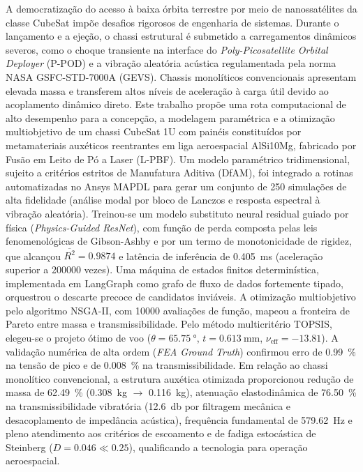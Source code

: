 
\begin{center}
\ABNTEXchapterfont\bfseries\Large\imprimirtitulo
\end{center}

\begin{resumo}
A democratização do acesso à baixa órbita terrestre por meio de nanossatélites da classe CubeSat impõe desafios rigorosos de engenharia de sistemas. Durante o lançamento e a ejeção, o chassi estrutural é submetido a carregamentos dinâmicos severos, como o choque transiente na interface do \textit{Poly-Picosatellite Orbital Deployer} (P-POD) e a vibração aleatória acústica regulamentada pela norma NASA GSFC-STD-7000A (GEVS). Chassis monolíticos convencionais apresentam elevada massa e transferem altos níveis de aceleração à carga útil devido ao acoplamento dinâmico direto. Este trabalho propõe uma rota computacional de alto desempenho para a concepção, a modelagem paramétrica e a otimização multiobjetivo de um chassi CubeSat 1U com painéis constituídos por metamateriais auxéticos reentrantes em liga aeroespacial AlSi10Mg, fabricado por Fusão em Leito de Pó a Laser (L-PBF). Um modelo paramétrico tridimensional, sujeito a critérios estritos de Manufatura Aditiva (DfAM), foi integrado a rotinas automatizadas no Ansys MAPDL para gerar um conjunto de 250 simulações de alta fidelidade (análise modal por bloco de Lanczos e resposta espectral à vibração aleatória). Treinou-se um modelo substituto neural residual guiado por física (\textit{Physics-Guided ResNet}), com função de perda composta pelas leis fenomenológicas de Gibson-Ashby e por um termo de monotonicidade de rigidez, que alcançou $\overline{R^2} = \num{0.9874}$ e latência de inferência de \SI{0.405}{\milli\second} (aceleração superior a \num{200000} vezes). Uma máquina de estados finitos determinística, implementada em LangGraph como grafo de fluxo de dados fortemente tipado, orquestrou o descarte precoce de candidatos inviáveis. A otimização multiobjetivo pelo algoritmo NSGA-II, com \num{10000} avaliações de função, mapeou a fronteira de Pareto entre massa e transmissibilidade. Pelo método multicritério TOPSIS, elegeu-se o projeto ótimo de voo ($\theta = \SI{65.75}{\degree}$, $t = \SI{0.613}{\milli\metre}$, $\nu_{\text{eff}} = \num{-13.81}$). A validação numérica de alta ordem (\textit{FEA Ground Truth}) confirmou erro de \SI{0.99}{\percent} na tensão de pico e de \SI{0.008}{\percent} na transmissibilidade. Em relação ao chassi monolítico convencional, a estrutura auxética otimizada proporcionou redução de massa de \SI{62.49}{\percent} (\SI{0.308}{\kilo\gram} $\to$ \SI{0.116}{\kilo\gram}), atenuação elastodinâmica de \SI{76.50}{\percent} na transmissibilidade vibratória (\SI{12.6}{\decibel} por filtragem mecânica e desacoplamento de impedância acústica), frequência fundamental de \SI{579.62}{\hertz} e pleno atendimento aos critérios de escoamento e de fadiga estocástica de Steinberg ($D = \num{0.046} \ll \num{0.25}$), qualificando a tecnologia para operação aeroespacial.


\end{resumo}
